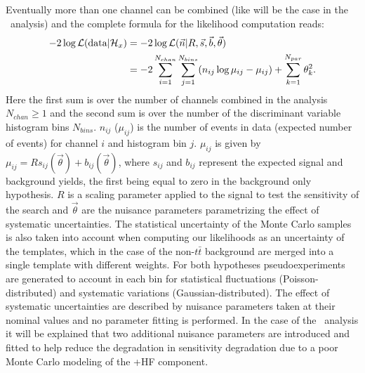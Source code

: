Eventually more than one channel can be combined (like will be
the case in the \htx\ analysis) and the complete formula for
the likelihood computation reads:
\begin{align}
-2 \log {\cal L}({\rm data}|\mathcal{H}_x) 
   & =  
   -2 \log {\cal L}(\vec{n}|R,\vec{s},\vec{b},\vec{\theta}) \notag\\
   & =  
  -2 \sum_{i=1}^{N_{chan}}\sum_{j=1}^{N_{bins}} (n_{ij}\log \mu_{ij}-\mu_{ij})+\sum_{k=1}^{N_{par}} \theta_k^2.
\end{align}
Here the first sum is over the number of channels
combined in the analysis $N_{chan}\geq 1$ and the 
second sum is over the number of the discriminant variable
histogram bins $N_{bins}$. $n_{ij}$ ($\mu_{ij}$) is the 
number of events in data (expected number of events) 
for channel $i$ and histogram bin $j$. $\mu_{ij}$ is given by
$\mu_{ij} = R s_{ij}(\vec{\theta})+ b_{ij}(\vec{\theta})$, 
where $s_{ij}$  and $b_{ij}$ represent the
expected signal and background yields, 
the first being equal to zero in the background only hypothesis.
$R$ is a scaling 
parameter applied to the signal
to test the sensitivity of the search and $\vec{\theta}$
are the nuisance parameters parametrizing the effect of
systematic uncertainties. 
The statistical uncertainty of the Monte Carlo samples is 
also taken into account when computing our likelihoods as
an uncertainty of the templates, which in the case of
the non-$t\bar{t}$ background are merged into a single
template  with different weights.
For both hypotheses pseudoexperiments are generated to
account in each bin for statistical fluctuations (Poisson-distributed)
and systematic variations (Gaussian-distributed). The effect of
systematic uncertainties are described by nuisance parameters taken
at their nominal values and no parameter fitting is performed.
In the case of the \htx\ analysis it will be explained that
two additional nuisance parameters are introduced and fitted
to help reduce the degradation in sensitivity degradation due to a poor
Monte Carlo modeling of the \ttbar+HF component.


